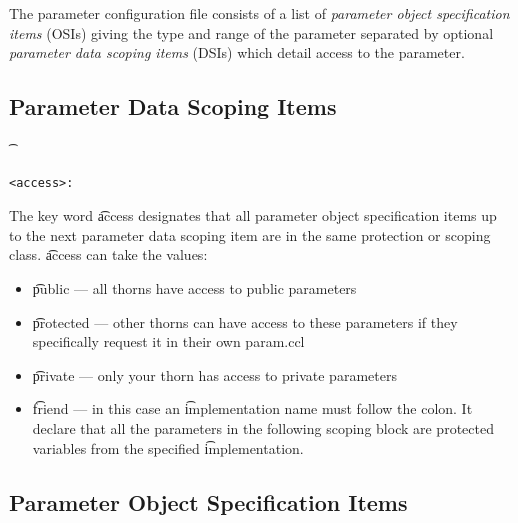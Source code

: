 The parameter configuration file consists of a list of 
{\it parameter object specification items} (OSIs) giving the type and
range of the parameter separated by optional
{\it parameter data scoping items} (DSIs) which detail access to the
parameter.

\subsection{Parameter Data Scoping Items}
{\t
\begin{verbatim}
<access>:
\end{verbatim}
}
The key word {\t access} designates that all parameter object specification
items up to the next parameter data scoping item are in the same 
protection or scoping class. {\t access} can take the values:
\begin{itemize}
\item{} {\t public} --- all thorns have access to public parameters
\item{} {\t protected} --- other thorns can have access to these 
                           parameters if they specifically request
                           it in their own param.ccl
\item{} {\t private} --- only your thorn has access to private parameters
\item{} {\t friend} --- in this case an {\t implementation} name must follow
                        the colon. It declare that all the parameters in 
                        the following scoping block are protected variables
                        from the specified {\t implementation}.
\end{itemize}


\subsection{Parameter Object Specification Items}

